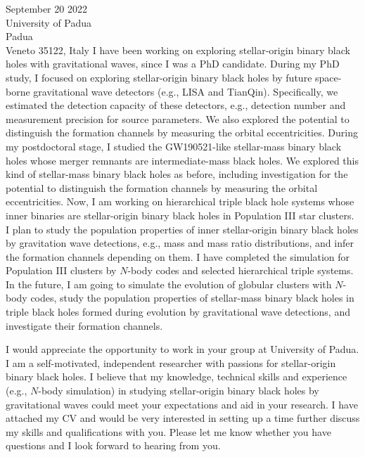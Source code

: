 \documentclass[11pt,a4paper,sans]{letter} %
\begin{document}
\begin{letter}{September 20 2022 \\
University of Padua\\
Padua\\ 
Veneto 35122, Italy}
I have been working on exploring stellar-origin binary black holes with gravitational waves, since I was a PhD
    candidate. During my PhD study, I focused on exploring stellar-origin binary black holes by future
    space-borne gravitational wave detectors (e.g., LISA and TianQin). Specifically, we estimated the detection capacity of
    these detectors, e.g., detection number and measurement precision for source parameters. We also explored the
    potential to distinguish the formation channels by measuring the orbital eccentricities. During my postdoctoral
    stage, I studied the GW190521-like stellar-mass binary black holes whose merger remnants are
    intermediate-mass black holes. We explored this kind of stellar-mass binary black holes as before, including
    investigation for the potential to distinguish the formation channels by measuring the orbital eccentricities. 
    Now, I am working on
    hierarchical triple
    black hole systems whose inner binaries are stellar-origin binary black holes in Population III star clusters. I plan to
    study the population properties of inner stellar-origin binary black holes by gravitation wave detections, e.g., mass and mass ratio distributions, and
    infer the formation channels depending on them. I have completed the simulation for Population III
    clusters by $N$-body codes and selected hierarchical triple systems.  
    In the future, I am going to simulate the evolution of globular clusters with $N$-body codes, study the
    population properties of stellar-mass
    binary black holes in triple black holes formed during evolution by gravitational wave detections, and 
    investigate their formation channels.  

I would appreciate the opportunity to work in your group at University of Padua. I am a self-motivated, independent researcher with
    passions for stellar-origin binary black holes. I believe that my knowledge,
    technical skills and experience (e.g., $N$-body simulation) in studying stellar-origin binary black holes by
    gravitational waves could meet your expectations and aid in your research. I have attached my CV and would be very interested in setting up a time further
discuss my skills and qualifications with you. Please let me know whether you have questions and I look forward to
hearing from you. 


\end{letter}
\end{document}
